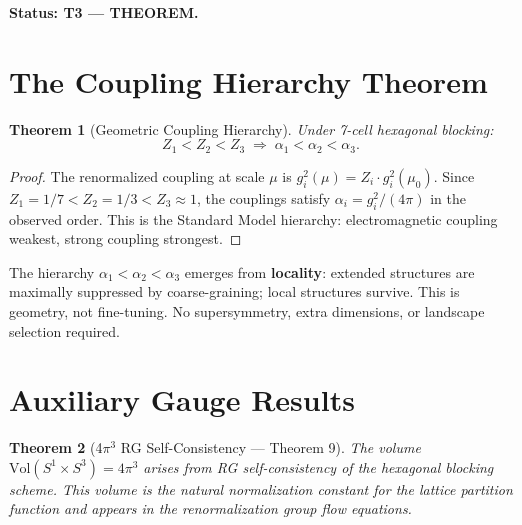 \documentclass[11pt,letterpaper]{article}
\newtheorem{theorem}{Theorem}[section]
\begin{document}
\textbf{Status: T3 --- THEOREM.}

\section{The Coupling Hierarchy Theorem}

\begin{theorem}[Geometric Coupling Hierarchy]\label{thm:hierarchy}
Under 7-cell hexagonal blocking:
\begin{equation}
  \boxed{Z_1 < Z_2 < Z_3 \;\Longrightarrow\; \alpha_1 < \alpha_2 < \alpha_3.}
\end{equation}
\end{theorem}

\begin{proof}
The renormalized coupling at scale $\mu$ is $g_i^2(\mu) = Z_i\cdot g_i^2(\mu_0)$.
Since $Z_1=1/7 < Z_2=1/3 < Z_3\approx1$, the couplings satisfy
$\alpha_i = g_i^2/(4\pi)$ in the observed order.
This is the Standard Model hierarchy: electromagnetic coupling weakest,
strong coupling strongest.
\end{proof}

\begin{tcolorbox}[colback=hlrtgreen!5!white,colframe=hlrtgreen,title=Physical Intuition]
The hierarchy $\alpha_1 < \alpha_2 < \alpha_3$ emerges from \textbf{locality}:
extended structures are maximally suppressed by coarse-graining; local
structures survive.  This is geometry, not fine-tuning.  No supersymmetry,
extra dimensions, or landscape selection required.
\end{tcolorbox}

\section{Auxiliary Gauge Results}

\begin{theorem}[4$\pi^3$ RG Self-Consistency --- Theorem 9]\label{thm:T9}
The volume $\mathrm{Vol}(S^1\times S^3) = 4\pi^3$ arises from RG
self-consistency of the hexagonal blocking scheme.  This volume is the
natural normalization constant for the lattice partition function and
appears in the renormalization group flow equations.
\end{theorem}
\end{document}
